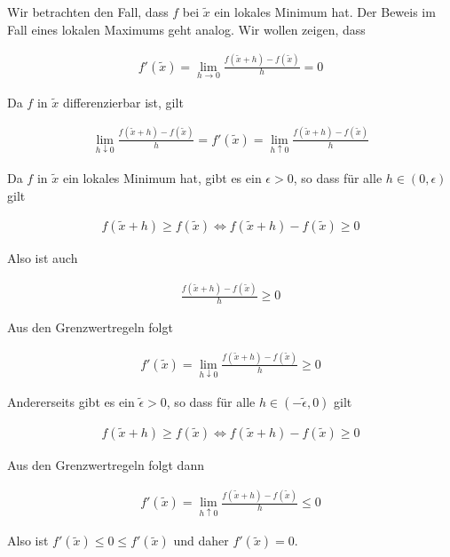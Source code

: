 \documentclass[fontsize=9pt,
               parskip=half-,
               DIV=14,
               listof=chapterentry,
               tocflat]{scrbook}
\begin{document}
\begin{proof*}
Wir betrachten den Fall, dass $f$ bei ${\tilde {x}}$ ein lokales Minimum hat. Der Beweis im Fall eines lokalen Maximums geht analog. Wir wollen zeigen, dass

\begin{align*}
f'({\tilde {x}})=\lim _{h\to 0}{\frac {f({\tilde {x}}+h)-f({\tilde {x}})}{h}}=0
\end{align*}

Da $f$ in ${\tilde {x}}$ differenzierbar ist, gilt

\begin{align*}
\lim _{h\downarrow 0}{\frac {f({\tilde {x}}+h)-f({\tilde {x}})}{h}}=f'({\tilde {x}})=\lim _{h\uparrow 0}{\frac {f({\tilde {x}}+h)-f({\tilde {x}})}{h}}
\end{align*}

Da $f$ in ${\tilde {x}}$ ein lokales Minimum hat, gibt es ein $\epsilon >0$, so dass für alle $h\in (0,\epsilon )$ gilt

\begin{align*}
f({\tilde {x}}+h)\geq f({\tilde {x}})\iff f({\tilde {x}}+h)-f({\tilde {x}})\geq 0
\end{align*}

Also ist auch

\begin{align*}
{\frac {f({\tilde {x}}+h)-f({\tilde {x}})}{h}}\geq 0
\end{align*}

Aus den Grenzwertregeln folgt

\begin{align*}
f'({\tilde {x}})=\lim _{h\downarrow 0}{\frac {f({\tilde {x}}+h)-f({\tilde {x}})}{h}}\geq 0
\end{align*}

Andererseits gibt es ein ${\tilde {\epsilon }}>0$, so dass für alle $h\in (-{\tilde {\epsilon }},0)$ gilt

\begin{align*}
f({\tilde {x}}+h)\geq f({\tilde {x}})\iff f({\tilde {x}}+h)-f({\tilde {x}})\geq 0
\end{align*}

Aus den Grenzwertregeln folgt dann

\begin{align*}
f'({\tilde {x}})=\lim _{h\uparrow 0}{\frac {f({\tilde {x}}+h)-f({\tilde {x}})}{h}}\leq 0
\end{align*}

Also ist $f'({\tilde {x}})\leq 0\leq f'({\tilde {x}})$ und daher $f'({\tilde {x}})=0$.

\end{proof*}
\end{document}
